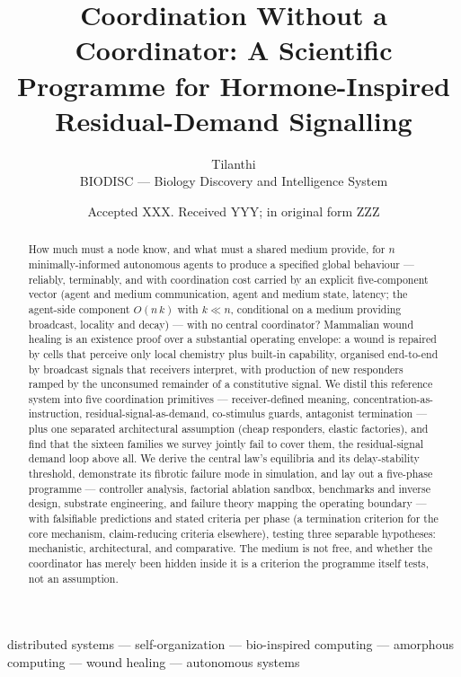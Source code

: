 \documentclass[twoside,twocolumn,usenatbib]{mnras}
\title[Coordination Without a Coordinator]{Coordination Without a Coordinator:
  A Scientific Programme for Hormone-Inspired Residual-Demand Signalling}
\author[Tilanthi]{Tilanthi\\
BIODISC --- Biology Discovery and Intelligence System}
\date{Accepted XXX. Received YYY; in original form ZZZ}
\begin{document}
\label{firstpage}
\pagerange{\pageref{firstpage}--\pageref{lastpage}}

\maketitle

\begin{abstract}
How much must a node know, and what must a shared medium provide, for $n$
minimally-informed autonomous agents to produce a specified global behaviour
--- reliably, terminably, and with coordination cost carried by an explicit
five-component vector (agent and medium communication, agent and medium
state, latency; the agent-side component $O(n\,k)$ with $k \ll n$,
conditional on a medium providing broadcast, locality and decay)
--- with no central coordinator? Mammalian wound healing is an existence
proof over a substantial operating envelope: a wound is repaired by cells
that perceive only local chemistry plus built-in capability, organised
end-to-end by broadcast signals that receivers interpret, with production
of new responders ramped by the unconsumed remainder of a constitutive
signal. We distil this reference system into five coordination primitives
--- receiver-defined meaning, concentration-as-instruction,
residual-signal-as-demand, co-stimulus guards, antagonist termination ---
plus one separated architectural assumption (cheap responders, elastic
factories), and find that the sixteen families we survey jointly fail
to cover them, the residual-signal demand loop above all. We derive the
central law's equilibria and its delay-stability threshold, demonstrate
its fibrotic failure mode in simulation, and lay out
a five-phase programme --- controller analysis, factorial ablation
sandbox, benchmarks and inverse design, substrate engineering, and
failure theory mapping the operating boundary --- with falsifiable
predictions and stated criteria per phase (a termination criterion for
the core mechanism, claim-reducing criteria elsewhere), testing three
separable hypotheses: mechanistic, architectural, and comparative.
The medium is not free, and whether the coordinator has merely been
hidden inside it is a criterion the programme itself tests, not an
assumption.
\end{abstract}

\begin{keywords}
distributed systems --- self-organization --- bio-inspired computing ---
amorphous computing --- wound healing --- autonomous systems
\end{keywords}
\end{document}
